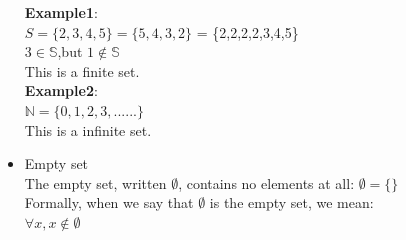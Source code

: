 \documentclass{article}
\begin{document}
\begin{itemize}
\textbf{Example1}:\\
$S = \{2,3,4,5\} = \{5,4,3,2\}$ = \{2,2,2,2,3,4,5\}\\
$3 \in \mathbb{S}$,but $1 \notin \mathbb{S}$\\
This is a finite set.\\

\textbf{Example2}:\\
$\mathbb{N} = \{0,1,2,3,......\}$\\
This is a infinite set.
\item Empty set\\
The empty set, written $\emptyset$, contains no elements at all: $\emptyset = \{\}$\\
Formally, when we say that $\emptyset$ is the empty set, we mean:\\
$\forall x , x \notin \emptyset$


\end{itemize}
\end{document}
